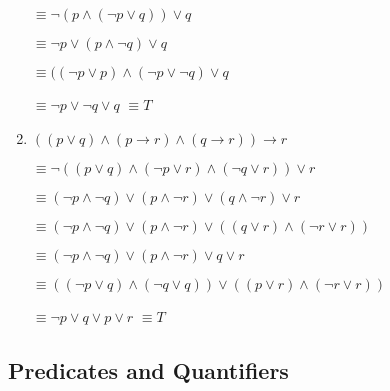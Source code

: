 \documentclass{sig-alternate-05-2015}
\begin{document}
\begin{enumerate}
$\equiv \neg (p\wedge (\neg p \vee q))\vee q$

$\equiv \neg p\vee ( p \wedge \neg q)\vee q$

$\equiv ((\neg p\vee p) \wedge (\neg p \vee \neg q)\vee q$

$\equiv \neg p \vee \neg q\vee q$ $\equiv T$

\item $((p\vee q)\wedge (p \rightarrow r) \wedge (q\rightarrow r))\rightarrow r$

$\equiv \neg((p\vee q)\wedge (\neg p \vee r) \wedge (\neg q\vee r))\vee r$

$\equiv (\neg p\wedge \neg q)\vee (p \wedge \neg r) \vee (q\wedge \neg r)\vee r$

$\equiv (\neg p\wedge \neg q)\vee (p \wedge \neg r) \vee ((q\vee r) \wedge (\neg r\vee r))$

$\equiv (\neg p\wedge \neg q)\vee (p \wedge \neg r) \vee q\vee r$

$\equiv ((\neg p\vee q )\wedge (\neg q\vee q)) \vee ((p \vee r)\wedge (\neg r\vee r))$

$\equiv \neg p\vee q  \vee p \vee r$ $\equiv T$
\end{enumerate}

\subsection{Predicates and Quantifiers}
\end{document}
